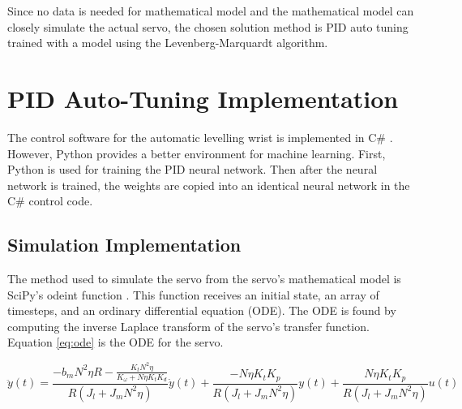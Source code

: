 \documentclass[letterpaper,12pt]{article}
\begin{document}
Since no data is needed for mathematical model and the mathematical model can closely simulate the actual servo, the chosen solution method is PID auto tuning trained with a model using the Levenberg-Marquardt algorithm.

\section{PID Auto-Tuning Implementation}
The control software for the automatic levelling wrist is implemented in C\# \cite{blincdev}. However, Python provides a better environment for machine learning. First, Python is used for training the PID neural network. Then after the neural network is trained, the weights are copied into an identical neural network in the C\# control code.

\subsection{Simulation Implementation}
The method used to simulate the servo from the servo's mathematical model is SciPy's odeint function \cite{odeint}. This function receives an initial state, an array of timesteps, and an ordinary differential equation (ODE). The ODE is found by computing the inverse Laplace transform of the servo's transfer function. Equation \ref{eq:ode} is the ODE for the servo.

\begin{equation}
	\label{eq:ode}
	\ddot y(t) = \frac{- b_m N^2 \eta R - \frac{K_t N^2 \eta}{K_\omega + N \eta K_t K_d}}{R(J_l + J_m N^2 \eta)} \dot y(t) + \frac{-N \eta K_t K_p}{R(J_l + J_m N^2 \eta)} y(t) + \frac{N \eta K_t K_p}{R(J_l + J_m N^2 \eta)} u(t)
\end{equation}
\end{document}
